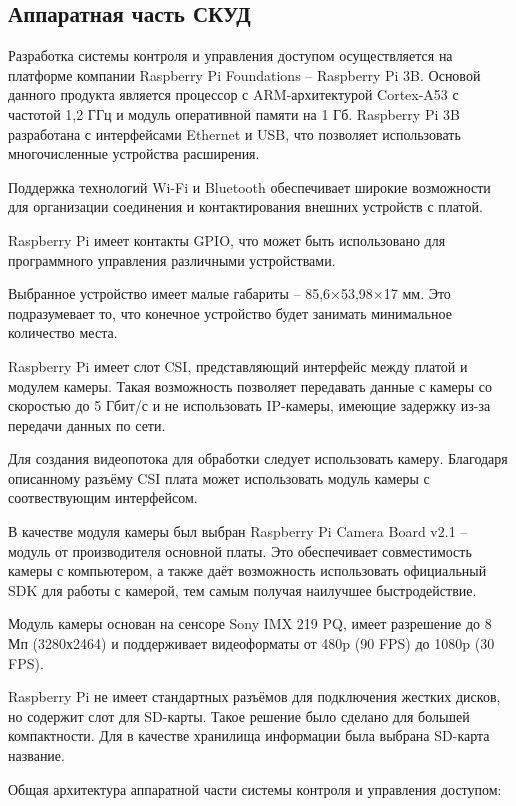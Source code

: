 \subsection{Аппаратная часть СКУД}

Разработка системы контроля и управления доступом осуществляется на платформе компании Raspberry Pi Foundations -- Raspberry Pi 3B. Основой данного продукта является процессор с ARM-архитектурой Cortex-A53 с частотой  1,2 ГГц и модуль оперативной памяти на 1 Гб. Raspberry Pi 3B разработана с интерфейсами Ethernet и USB, что позволяет использовать многочисленные устройства расширения. 

Поддержка технологий Wi-Fi и Bluetooth обеспечивает широкие возможности для организации соединения и контактирования внешних устройств с платой.

Raspberry Pi имеет контакты GPIO, что может быть использовано для программного управления различными устройствами.

Выбранное устройство имеет малые габариты -- 85,6×53,98×17 мм. Это подразумевает то, что конечное устройство будет занимать минимальное количество места. %


Raspberry Pi имеет слот CSI, представляющий интерфейс между платой и модулем камеры. Такая возможность позволяет передавать данные с камеры со скоростью до 5 Гбит/с и не использовать IP-камеры, имеющие задержку из-за передачи данных по сети.

Для создания видеопотока для обработки следует использовать камеру. Благодаря описанному разъёму CSI плата может использовать модуль камеры с соотвествующим интерфейсом.

В качестве модуля камеры был выбран Raspberry Pi Camera Board v2.1 -- модуль от производителя основной платы. Это обеспечивает совместимость камеры с компьютером, а также даёт возможность использовать официальный SDK для работы с камерой, тем самым получая наилучшее быстродействие.


Модуль камеры основан на сенсоре Sony IMX 219 PQ, имеет разрешение до 8 Мп (3280х2464) и поддерживает видеоформаты от 480p (90 FPS) до 1080p (30 FPS).

Raspberry Pi не имеет стандартных разъёмов для подключения жестких дисков, но содержит слот для SD-карты. Такое решение было сделано для большей компактности. Для в качестве хранилища информации была выбрана SD-карта {название}. %

Общая архитектура аппаратной части системы контроля и управления доступом:


